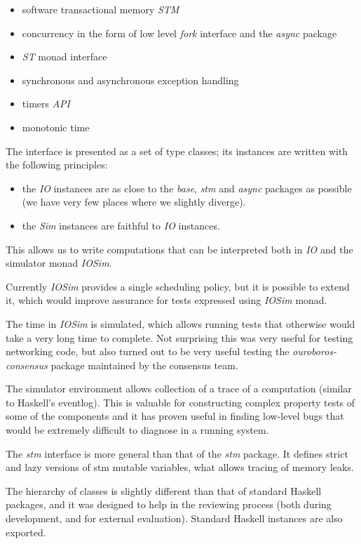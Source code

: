 \documentclass[11pt,a4paper]{article}
\begin{document}
\begin{itemize}
\item
  software transactional memory \emph{STM}
\item
  concurrency in the form of low level \emph{fork} interface and the
  \emph{async} package
\item
  \emph{ST} monad interface
\item
  synchronous and asynchronous exception handling
\item
  timers \emph{API}
\item
  monotonic time
\end{itemize}

The interface is presented as a set of type classes; its instances are
written with the following principles:

\begin{itemize}
\item
  the \emph{IO} instances are as close to the \emph{base}, \emph{stm}
  and \emph{async} packages as possible (we have very few places where
  we slightly diverge).
\item
  the \emph{Sim} instances are faithful to \emph{IO} instances.
\end{itemize}

This allows us to write computations that can be interpreted both in
\emph{IO} and the simulator monad \emph{IOSim}.

Currently \emph{IOSim} provides a single scheduling policy, but it is
possible to extend it, which would improve assurance for tests expressed
using \emph{IOSim} monad.

The time in \emph{IOSim} is simulated, which allows running tests that
otherwise would take a very long time to complete. Not surprising this
was very useful for testing networking code, but also turned out to be
very useful testing the \emph{ouroboros-consensus} package maintained by
the consensus team.

The simulator environment allows collection of a trace of a computation
(similar to Haskell's eventlog). This is valuable for constructing
complex property tests of some of the components and it has proven
useful in finding low-level bugs that would be extremely difficult to
diagnose in a running system.

The \emph{stm} interface is more general than that of the \emph{stm}
package. It defines strict and lazy versions of stm mutable variables,
what allows tracing of memory leaks.

The hierarchy of classes is slightly different than that of standard
Haskell packages, and it was designed to help in the reviewing process
(both during development, and for external evaluation). Standard Haskell
instances are also exported.
\end{document}
